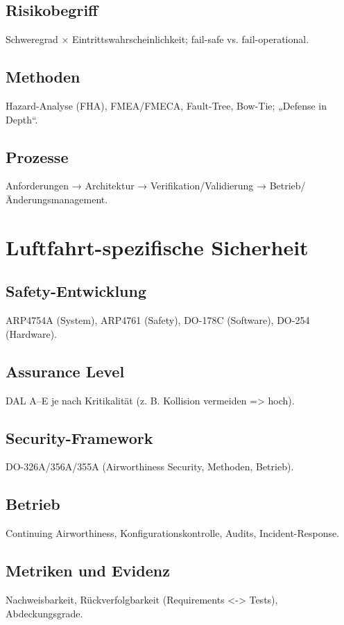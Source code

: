 \subsection{Risikobegriff}
Schweregrad × Eintrittswahrscheinlichkeit; fail-safe vs. fail-operational.

\subsection{Methoden}
Hazard-Analyse (FHA), FMEA/FMECA, Fault-Tree, Bow-Tie; „Defense in Depth“.

\subsection{Prozesse}
Anforderungen → Architektur → Verifikation/Validierung → Betrieb/Änderungsmanagement.



\section{Luftfahrt-spezifische Sicherheit} 

\subsection{Safety-Entwicklung}
ARP4754A (System), ARP4761 (Safety), DO-178C (Software), DO-254 (Hardware).

\subsection{Assurance Level}
DAL A–E je nach Kritikalität (z. B. Kollision vermeiden => hoch).

\subsection{Security-Framework}
DO-326A/356A/355A (Airworthiness Security, Methoden, Betrieb).

\subsection{Betrieb}
Continuing Airworthiness, Konfigurationskontrolle, Audits, Incident-Response.

\subsection{Metriken und Evidenz}
Nachweisbarkeit, Rückverfolgbarkeit (Requirements <-> Tests), Abdeckungsgrade.




